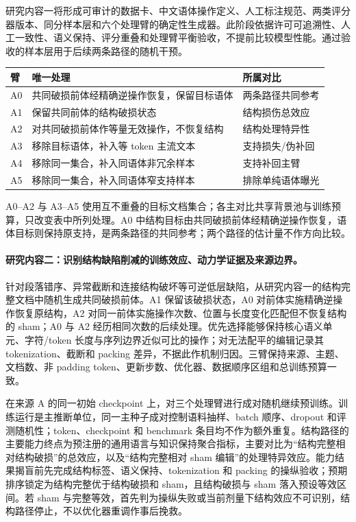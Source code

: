 研究内容一将形成可审计的数据卡、中文语体操作定义、人工标注规范、两类评分器版本、同分样本层和六个处理臂的确定性生成器。此阶段依据许可可追溯性、人工一致性、语义保持、评分重叠和处理臂平衡验收，不提前比较模型性能。通过验收的样本层用于后续两条路径的随机干预。

\begin{center}
\begingroup
\small
\renewcommand{\arraystretch}{1.12}
\begin{tabular}{p{}p{}p{}}
\hline
臂 & 唯一处理 & 所属对比 \\
\hline
A0 & 共同破损前体经精确逆操作恢复，保留目标语体 & 两条路径共同参考 \\
A1 & 保留共同前体的结构破损状态 & 结构损伤总效应 \\
A2 & 对共同破损前体作等量无效操作，不恢复结构 & 结构处理特异性 \\
A3 & 移除目标语体，补入等 token 主流文本 & 支持损失/伪补回 \\
A4 & 移除同一集合，补入同语体非冗余样本 & 支持补回主臂 \\
A5 & 移除同一集合，补入同语体窄支持样本 & 排除单纯语体曝光 \\
\hline
\end{tabular}
\endgroup
\end{center}

A0--A2 与 A3--A5 使用互不重叠的目标文档集合；各主对比共享背景池与训练预算，只改变表中所列处理。A0 中结构目标由共同破损前体经精确逆操作恢复，语体目标则保持原支持，是两条路径的共同参考；两个路径的估计量不作方向比较。

\paragraph{研究内容二：识别结构缺陷削减的训练效应、动力学证据及来源边界。}

针对段落错序、异常截断和连接结构破坏等可逆低层缺陷，从研究内容一的结构完整文档中随机生成共同破损前体。A1 保留该破损状态，A0 对前体实施精确逆操作恢复原结构，A2 对同一前体实施操作次数、位置与长度变化匹配但不恢复结构的 sham；A0 与 A2 经历相同次数的后续处理。优先选择能够保持核心语义单元、字符/token 长度与序列边界近似可比的操作；对无法配平的编辑记录其 tokenization、截断和 packing 差异，不据此作机制归因。三臂保持来源、主题、文档数、非 padding token、更新步数、优化器、数据顺序区组和总训练预算一致。

在来源 A 的同一初始 checkpoint 上，对三个处理臂进行成对随机继续预训练。训练运行是主推断单位，同一主种子成对控制语料抽样、batch 顺序、dropout 和评测随机性；token、checkpoint 和 benchmark 条目均不作为额外重复。结构路径的主要能力终点为预注册的通用语言与知识保持聚合指标，主要对比为“结构完整相对结构破损”的总效应，以及“结构完整相对 sham 编辑”的处理特异效应。能力结果揭盲前先完成结构标签、语义保持、tokenization 和 packing 的操纵验收；预期排序锁定为结构完整优于结构破损和 sham，且结构破损与 sham 落入预设等效区间。若 sham 与完整等效，首先判为操纵失败或当前剂量下结构效应不可识别，结构路径停止，不以优化器重调作事后挽救。

